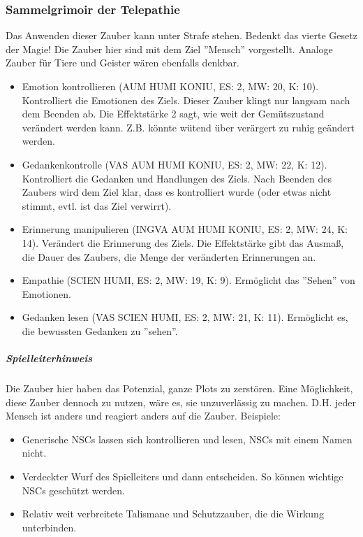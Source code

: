 \documentclass{article}
\begin{document}
\subsubsection{Sammelgrimoir der Telepathie}

Das Anwenden dieser Zauber kann unter Strafe stehen. Bedenkt das vierte Gesetz der Magie! Die Zauber hier sind mit dem
Ziel ''Mensch'' vorgestellt. Analoge Zauber für Tiere und Geister wären ebenfalls denkbar.

\begin{itemize}
\item Emotion kontrollieren (AUM HUMI KONIU, ES: 2, MW: 20, K: 10). Kontrolliert die Emotionen des Ziels. Dieser Zauber klingt nur langsam nach dem Beenden ab. Die Effektstärke 2 sagt, wie weit der Gemütszustand verändert werden kann. Z.B. könnte wütend über verärgert zu ruhig geändert werden.
\item Gedankenkontrolle (VAS AUM HUMI KONIU, ES: 2, MW: 22, K: 12). Kontrolliert die Gedanken und Handlungen des Ziels. Nach Beenden des Zaubers wird dem Ziel klar, dass es kontrolliert wurde (oder etwas nicht stimmt, evtl. ist das Ziel verwirrt).
\item Erinnerung manipulieren (INGVA AUM HUMI KONIU, ES: 2, MW: 24, K: 14). Verändert die Erinnerung des Ziels. Die Effektstärke gibt das Ausmaß, die Dauer des Zaubers, die Menge der veränderten Erinnerungen an.
\item Empathie (SCIEN HUMI, ES: 2, MW: 19, K: 9). Ermöglicht das ''Sehen'' von Emotionen.
\item Gedanken lesen (VAS SCIEN HUMI, ES: 2, MW: 21, K: 11). Ermöglicht es, die bewussten Gedanken zu ''sehen''.
\end{itemize}

\begin{mdframed}[hidealllines=true, backgroundcolor=black!10]
\subparagraph{Spielleiterhinweis}

Die Zauber hier haben das Potenzial, ganze Plots zu zerstören. Eine Möglichkeit, diese Zauber dennoch zu nutzen, wäre
es, sie unzuverlässig zu machen. D.H. jeder Mensch ist anders und reagiert anders auf die Zauber. Beispiele:

\begin{itemize}
\item Generische NSCs lassen sich kontrollieren und lesen, NSCs mit einem Namen nicht.
\item Verdeckter Wurf des Spielleiters und dann entscheiden. So können wichtige NSCs geschützt werden.
\item Relativ weit verbreitete Talismane und Schutzzauber, die die Wirkung unterbinden.
\end{itemize}

\end{mdframed}
\end{document}
